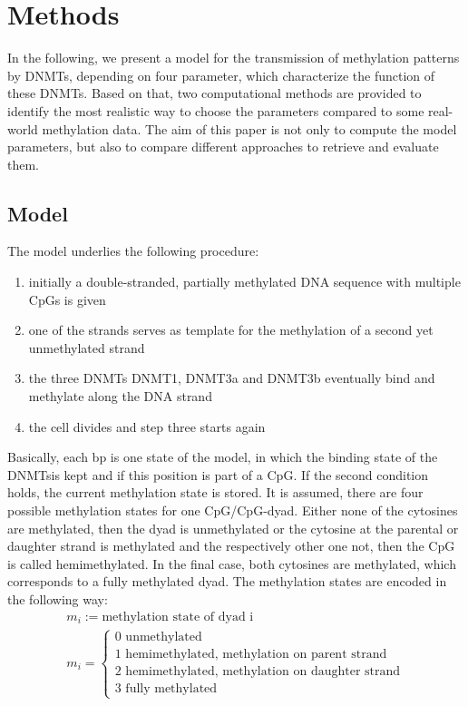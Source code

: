 \chapter{Methods}
\label{chapter:methods}
In the following, we present a model for the transmission of methylation patterns by \acfp{DNMT}, depending on four parameter, which characterize the function of these \acp{DNMT}. Based on that, two computational methods are provided to identify the most realistic way to choose the parameters compared to some real-world methylation data. The aim of this paper is not only to compute the model parameters, but also to compare different approaches to retrieve and evaluate them.

\section{Model}
\label{Model}
The model underlies the following procedure:
\begin{enumerate}
\item initially a double-stranded, partially methylated DNA sequence with multiple \acfp{CpG} is given
\item one of the strands serves as template for the methylation of a second yet unmethylated strand
\item the three \acp{DNMT} DNMT1, DNMT3a and DNMT3b eventually bind and methylate along the DNA strand
\item the cell divides and step three starts again
\end{enumerate}
Basically, each \acf{bp} is one state of the model, in which the binding state of the \acp{DNMT}is kept and if this position is part of a \ac{CpG}. If the second condition holds, the current methylation state is stored. It is assumed, there are four possible methylation states for one \ac{CpG}/\ac{CpG}-dyad. Either none of the cytosines are methylated, then the dyad is unmethylated or the cytosine at the parental or daughter strand is methylated and the respectively other one not, then the \ac{CpG} is called hemimethylated. In the final case, both cytosines are methylated, which corresponds to a fully methylated dyad. The methylation states are encoded in the following way:\newline
\begin{align}
m_i := \text{methylation state of dyad i}\\
m_i = \left\{
\begin{array}{l}
\text{0 unmethylated} \\
\text{1 hemimethylated, methylation on parent strand} \\
\text{2 hemimethylated, methylation on daughter strand} \\
\text{3 fully methylated}
\end{array}
\right.
\end{align}

